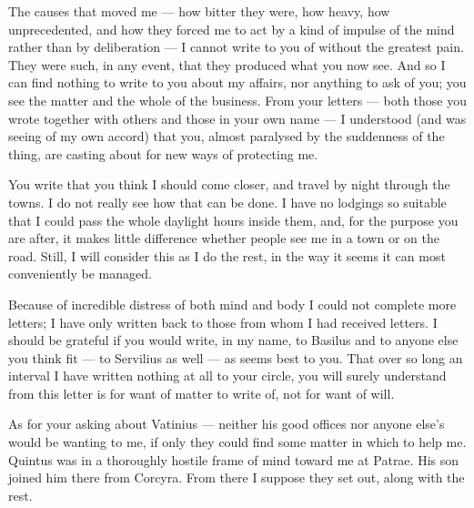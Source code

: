 

 The causes that moved me --- how bitter they were, how heavy, how unprecedented, and how they forced me to act by a kind of impulse of the mind rather than by deliberation --- I cannot write to you of without the greatest pain. They were such, in any event, that they produced what you now see. And so I can find nothing to write to you about my affairs, nor anything to ask of you; you see the matter and the whole of the business. From your letters --- both those you wrote together with others and those in your own name --- I understood (and was seeing of my own accord) that you, almost paralysed by the suddenness of the thing, are casting about for new ways of protecting me.

 You write that you think I should come closer, and travel by night through the towns. I do not really see how that can be done. I have no lodgings so suitable that I could pass the whole daylight hours inside them, and, for the purpose you are after, it makes little difference whether people see me in a town or on the road. Still, I will consider this as I do the rest, in the way it seems it can most conveniently be managed.

 Because of incredible distress of both mind and body I could not complete more letters; I have only written back to those from whom I had received letters. I should be grateful if you would write, in my name, to Basilus and to anyone else you think fit --- to Servilius as well --- as seems best to you. That over so long an interval I have written nothing at all to your circle, you will surely understand from this letter is for want of matter to write of, not for want of will.

 As for your asking about Vatinius --- neither his good offices nor anyone else's would be wanting to me, if only they could find some matter in which to help me. Quintus was in a thoroughly hostile frame of mind toward me at Patrae. His son joined him there from Corcyra. From there I suppose they set out, along with the rest.
